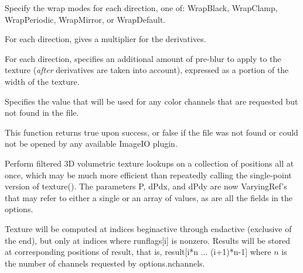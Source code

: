 \vspace{-24pt}
\vspace{10pt}
Specify the wrap modes for each direction, one of: 
{\cf WrapBlack}, {\cf WrapClamp}, {\cf WrapPeriodic}, {\cf WrapMirror},
or {\cf WrapDefault}.
\apiend

\vspace{-24pt}
\vspace{10pt}
For each direction, gives a multiplier for the derivatives.
\apiend

\vspace{-24pt}
\vspace{10pt}
For each direction, specifies an additional amount of pre-blur to apply
to the texture (\emph{after} derivatives are taken into account),
expressed as a portion of the width of the texture.
\apiend

\vspace{-24pt}
\vspace{10pt}
Specifies the value that will be used for any color channels that are
requested but not found in the file.
\apiend

This function returns {\cf true} upon success, or {\cf false} if the
file was not found or could not be opened by any available ImageIO
plugin.

\apiend


Perform filtered 3D volumetric texture lookups on a collection of positions all at
once, which may be much more efficient than repeatedly calling the
single-point version of {\cf texture()}.  The parameters {\cf P},
{\cf dPdx}, and {\cf dPdy} are now
{\cf VaryingRef}'s that may refer to either a single or an array of
values, as are all the fields in the {\cf options}.

Texture will be computed at indices {\cf beginactive} through
{\cf endactive} (exclusive of the end), but only at indices where {\cf runflags[i]}
is nonzero.  Results will be stored at corresponding positions of
{\cf result}, that is, {\cf result[i*n ... (i+1)*n-1]} where $n$ 
is the number of channels requested by {\cf options.nchannels}.


